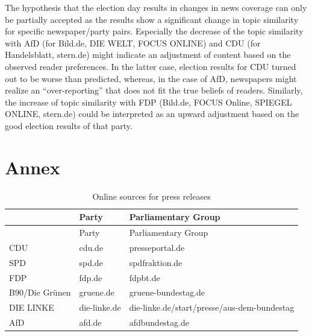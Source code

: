\documentclass[
  12pt,
]{article}
\begin{document}
The hypothesis that the election day results in changes in news coverage
can only be partially accepted as the results show a significant change
in topic similarity for specific newspaper/party pairs. Especially the
decrease of the topic similarity with AfD (for Bild.de, DIE WELT, FOCUS
ONLINE) and CDU (for Handelsblatt, stern.de) might indicate an
adjustment of content based on the observed reader preferences. In the
latter case, election results for CDU turned out to be worse than
predicted, whereas, in the case of AfD, newspapers might realize an
``over-reporting'' that does not fit the true beliefs of readers.
Similarly, the increase of topic similarity with FDP (Bild.de, FOCUS
Online, SPIEGEL ONLINE, stern.de) could be interpreted as an upward
adjustment based on the good election results of that party.

\newpage

\hypertarget{annex}{%
\section{Annex}\label{annex}}

\begin{longtable}[]{@{}lll@{}}
\caption{Online sources for press releases
\label{table:press_releases_sources}}\tabularnewline
\toprule
& Party & Parliamentary Group \\
\midrule
\endfirsthead
\toprule
& Party & Parliamentary Group \\
\midrule
\endhead
CDU & cdu.de & presseportal.de \\
SPD & spd.de & spdfraktion.de \\
FDP & fdp.de & fdpbt.de \\
B90/Die Grünen & gruene.de & gruene-bundestag.de \\
DIE LINKE & die-linke.de &
die-linke.de/start/presse/aus-dem-bundestag \\
AfD & afd.de & afdbundestag.de \\
\bottomrule
\end{longtable}
\end{document}
